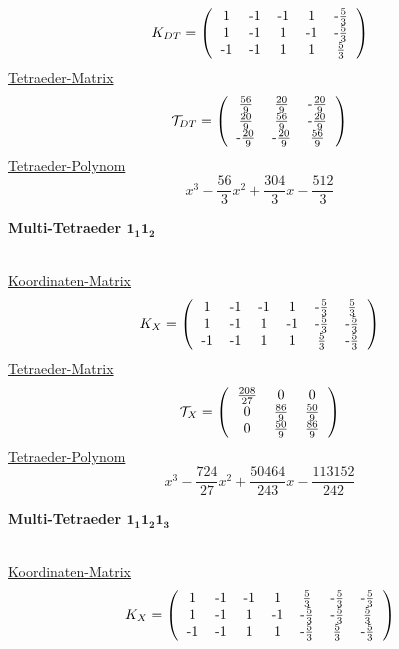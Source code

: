 \documentclass[12pt,titlepage,twoside,cleardoublepage]{article}
\theoremstyle{nummermitklammern}
\numberwithin{equation}{section}
\begin{document}
 \[
K_{DT}=\left(\begin{tabular}{ccccc}
1&-1&-1&1&-$\frac{5}{3}$ \\
1&-1&1&-1&-$\frac{5}{3}$\\
-1&-1&1&1&$\frac{5}{3}$\\
\end{tabular}\right)
\] 
\underline{Tetraeder-Matrix}
 \[
\mathcal{T}_{DT}=\left(\begin{tabular}{ccc}
$\frac{56}{9}$&$\frac{20}{9}$&-$\frac{20}{9}$ \\
$\frac{20}{9}$&$\frac{56}{9}$&-$\frac{20}{9}$\\
-$\frac{20}{9}$&-$\frac{20}{9}$&$\frac{56}{9}$\\
\end{tabular}\right)
\] 
\underline{Tetraeder-Polynom}
\[
x^3-\frac{56}{3}x^2+\frac{304}{3}x-\frac{512}{3}
\]
 \begin{large}
 \textbf{Multi-Tetraeder $\textbf{1}_\textbf{1}\textbf{1}_\textbf{2}$}
 \end{large}\\
 \underline{Koordinaten-Matrix}
\[ 
K_{X}=\left(\begin{tabular}{cccccc}
1&-1&-1&1&-$\frac{5}{3}$&$\frac{5}{3}$ \\
1&-1&1&-1&-$\frac{5}{3}$&-$\frac{5}{3}$\\
-1&-1&1&1&$\frac{5}{3}$&-$\frac{5}{3}$\\
\end{tabular}\right)
\] 
\underline{Tetraeder-Matrix}
\[
\mathcal{T}_X=\left(\begin{tabular}{ccc}
$\frac{208}{27}$&0&0\\
0&$\frac{86}{9}$&$\frac{50}{9}$\\
0&$\frac{50}{9}$&$\frac{86}{9}$\\
\end{tabular}\right)
\] 
\underline{Tetraeder-Polynom}
\[
x^3-\frac{724}{27}x^2+\frac{50464}{243}x-\frac{113152}{242}
\]
\begin{large}
 \textbf{Multi-Tetraeder $\textbf{1}_\textbf{1}\textbf{1}_
 \textbf{2}\textbf{1}_
 \textbf{3}$}
\end{large} \\
 \underline{Koordinaten-Matrix}
 \[ 
K_{X}=\left(\begin{tabular}{ccccccc}
1&-1&-1&1&$\frac{5}{3}$&-$\frac{5}{3}$&-$\frac{5}{3}$ \\
1&-1&1&-1&-$\frac{5}{3}$&-$\frac{5}{3}$&$\frac{5}{3}$\\
-1&-1&1&1&-$\frac{5}{3}$&$\frac{5}{3}$&-$\frac{5}{3}$\\
\end{tabular}\right)
\] 
\end{document}
